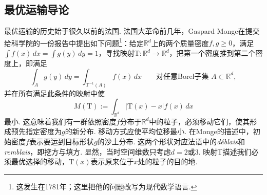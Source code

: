 \subsection*{最优运输导论}\label{sec:introduction}
最优运输的历史始于很久以前的法国. 法国大革命前几年，Gaspard Monge在提交给科学院的一份报告\cite{b239}中提出如下问题\footnote{这发生在1781年；这里把他的问题改写为现代数学语言.}：给定$\mathbb R^d$上的两个质量密度$f,g\geq0$，满足$\int f(x)\,dx=\int g(y)\,dy=1$，寻找映射$\mathrm{T}:\mathbb R^d\to\mathbb R^d$，把第一个密度推到第二个密度上，即满足
\begin{equation}\tag{1}\label{eq:intro1}
\int_A g(y)\,dy=\int_{\mathrm{T}^{-1}(A)}f(x)\,dx\qquad\text{对任意Borel子集 }A\subset\mathbb R^d,
\end{equation}
并在所有满足此条件的映射中使
\[
M(\mathrm{T}):=\int_{\mathbb R^d}|\mathrm{T}(x)-x|f(x)\,dx
\]
最小. 这意味着我们有一群依照密度$f$分布于$\mathbb R^d$中的粒子，必须移动它们，使其形成预先指定密度为$g$的新分布. 移动方式应使平均位移最小. 在Monge的描述中，初始密度$f$表示要运到目标形状$g$的沙土分布. 这两个形状对应法语中的\textit{déblais}和\textit{remblais}，即挖方与填方. 显然，当时空间维数只考虑$d=2$或$3$. 映射$\mathrm{T}$描述我们必须最优选择的移动，$\mathrm{T}(x)$表示原来位于$x$处的粒子的目的地.


